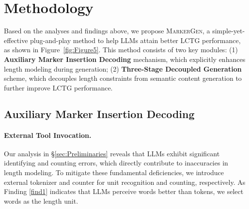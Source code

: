 \section{Methodology}

Based on the analyses and findings above, we propose \textsc{MarkerGen}, a simple-yet-effective plug-and-play method to help LLMs attain better LCTG performance, as shown in Figure~\ref{fig:Figure5}. This method consists of two key modules: (1) \textbf{Auxiliary Marker Insertion Decoding} mechanism, which explicitly enhances length modeling during generation; (2) \textbf{Three-Stage Decoupled Generation} scheme, which decouples length constraints from semantic content generation to further improve LCTG performance.

\subsection{Auxiliary Marker Insertion Decoding}
\label{sec:Auxiliary Length Marker Insertion Decoding}

\paragraph{External Tool Invocation.} 
Our analysis in \S\ref{sec:Preliminaries} reveals that LLMs exhibit significant identifying and counting errors, which directly contribute to inaccuracies in length modeling.
To mitigate these fundamental deficiencies, we introduce external tokenizer and counter for unit recognition and counting, respectively. 
As Finding \ref{find1} indicates that LLMs perceive words better than tokens, we select words as the length unit.
% 
